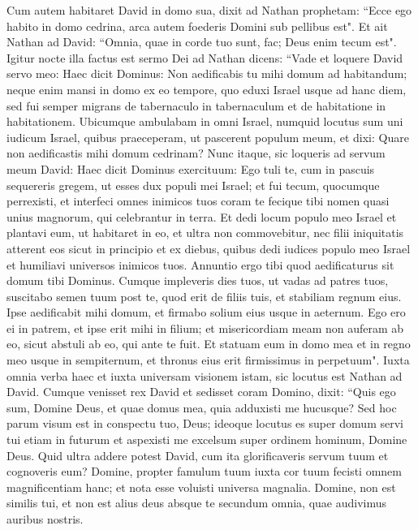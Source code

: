 \begin{biblechapter}  
\verse Cum autem habitaret David in domo sua, dixit ad Nathan prophetam: “Ecce ego habito in domo cedrina, arca autem foederis Domini sub pellibus est". 
\verse Et ait Nathan ad David: “Omnia, quae in corde tuo sunt, fac; Deus enim tecum est". 
\verse Igitur nocte illa factus est sermo Dei ad Nathan dicens: 
\verse “Vade et loquere David servo meo: Haec dicit Dominus: Non aedificabis tu mihi domum ad habitandum; 
\verse neque enim mansi in domo ex eo tempore, quo eduxi Israel usque ad hanc diem, sed fui semper migrans de tabernaculo in tabernaculum et de habitatione in habitationem. 
\verse Ubicumque ambulabam in omni Israel, numquid locutus sum uni iudicum Israel, quibus praeceperam, ut pascerent populum meum, et dixi: Quare non aedificastis mihi domum cedrinam? 
\verse Nunc itaque, sic loqueris ad servum meum David: Haec dicit Dominus exercituum: Ego tuli te, cum in pascuis sequereris gregem, ut esses dux populi mei Israel; 
\verse et fui tecum, quocumque perrexisti, et interfeci omnes inimicos tuos coram te fecique tibi nomen quasi unius magnorum, qui celebrantur in terra. 
\verse Et dedi locum populo meo Israel et plantavi eum, ut habitaret in eo, et ultra non commovebitur, nec filii iniquitatis atterent eos sicut in principio 
\verse et ex diebus, quibus dedi iudices populo meo Israel et humiliavi universos inimicos tuos. Annuntio ergo tibi quod aedificaturus sit domum tibi Dominus. 
\verse Cumque impleveris dies tuos, ut vadas ad patres tuos, suscitabo semen tuum post te, quod erit de filiis tuis, et stabiliam regnum eius. 
\verse Ipse aedificabit mihi domum, et firmabo solium eius usque in aeternum. 
\verse Ego ero ei in patrem, et ipse erit mihi in filium; et misericordiam meam non auferam ab eo, sicut abstuli ab eo, qui ante te fuit. 
\verse Et statuam eum in domo mea et in regno meo usque in sempiternum, et thronus eius erit firmissimus in perpetuum". 
\verse Iuxta omnia verba haec et iuxta universam visionem istam, sic locutus est Nathan ad David. 
\verse Cumque venisset rex David et sedisset coram Domino, dixit: “Quis ego sum, Domine Deus, et quae domus mea, quia adduxisti me hucusque? 
\verse Sed hoc parum visum est in conspectu tuo, Deus; ideoque locutus es super domum servi tui etiam in futurum et aspexisti me excelsum super ordinem hominum, Domine Deus. 
\verse Quid ultra addere potest David, cum ita glorificaveris servum tuum et cognoveris eum? 
\verse Domine, propter famulum tuum iuxta cor tuum fecisti omnem magnificentiam hanc; et nota esse voluisti universa magnalia. 
\verse Domine, non est similis tui, et non est alius deus absque te secundum omnia, quae audivimus auribus nostris. 

\end{biblechapter}
